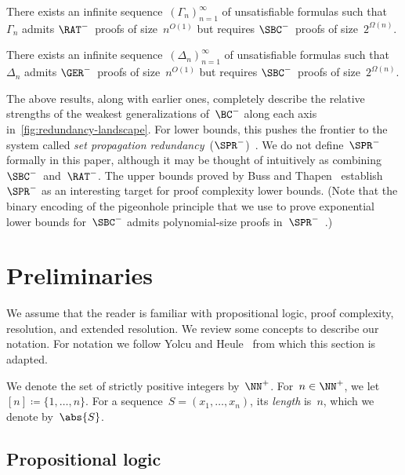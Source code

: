 \documentclass[10pt,a4paper]{article}
\begin{document}
\begin{theorem}\label{thm:RAT-from-SBC}
  There exists an infinite sequence~$(\Gamma_n)_{n = 1}^\infty$ of unsatisfiable formulas
  such that $\Gamma_n$ admits $\RAT^-$~proofs of size~$n^{O(1)}$
  but requires $\SBC^-$~proofs of size~$2^{\Omega(n)}$.
\end{theorem}

\begin{theorem}\label{thm:GER-from-SBC}
  There exists an infinite sequence~$(\Delta_n)_{n = 1}^\infty$ of unsatisfiable formulas
  such that $\Delta_n$ admits $\GER^-$~proofs of size~$n^{O(1)}$
  but requires $\SBC^-$~proofs of size~$2^{\Omega(n)}$.
\end{theorem}

The above results, along with earlier ones,
completely describe the relative strengths
of the weakest generalizations of~$\BC^-$
along each axis in~\cref{fig:redundancy-landscape}.
For lower bounds, this pushes the frontier
to the system called \emph{set propagation redundancy}~($\SPR^-$)~\cite{HKB20}.
We do not define~$\SPR^-$ formally in this paper,
although it may be thought of intuitively
as combining $\SBC^-$~and~$\RAT^-$.
The upper bounds proved by Buss and Thapen~\cite{BT21}
establish~$\SPR^-$ as an interesting target
for proof complexity lower bounds.
(Note that the binary encoding of the pigeonhole principle
that we use to prove exponential lower bounds for~$\SBC^-$
admits polynomial-size proofs in~$\SPR^-$~\cite[Theorem~4.4]{BT21}.)

\section{Preliminaries}
\label{sec:preliminaries}

We assume that the reader is familiar with propositional logic,
proof complexity, resolution, and extended resolution.
We review some concepts to describe our notation.
For notation we follow Yolcu and Heule~\cite{YH23} from which this section is adapted.

We denote the set of strictly positive integers by~$\NN^+$.
For~$n \in \NN^+$, we let $[n] \coloneqq \{1, \dots, n\}$.
For a sequence~$S = (x_1, \dots, x_n)$,
its \emph{length} is~$n$, which we denote by~$\abs{S}$.

\subsection{Propositional logic}
\label{sec:propositional-logic}
\end{document}
